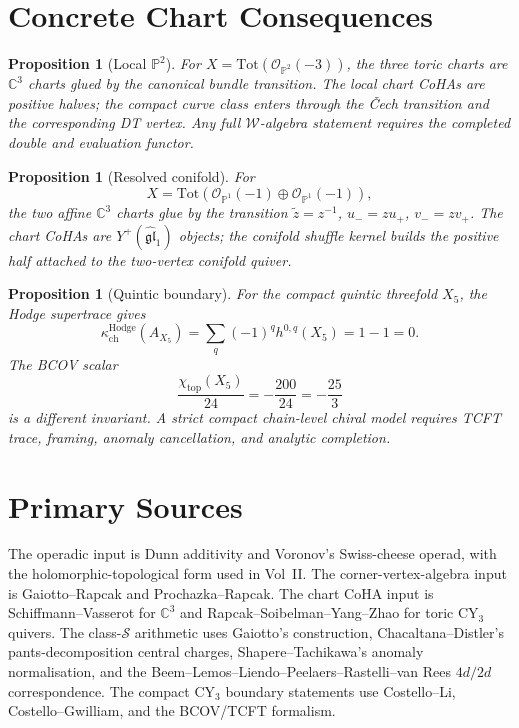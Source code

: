 \documentclass[11pt]{article}
\newtheorem{proposition}[theorem]{Proposition}
\providecommand{\C}{\mathbb{C}}
\providecommand{\bP}{\mathbb{P}}
\providecommand{\cW}{\mathcal{W}}
\providecommand{\cO}{\mathcal{O}}
\providecommand{\kch}{\kappa_{\mathrm{ch}}}
\begin{document}
\section{Concrete Chart Consequences}

\begin{proposition}[Local $\bP^2$]
For $X=\mathrm{Tot}(\cO_{\bP^2}(-3))$, the three toric charts are
$\C^3$ charts glued by the canonical bundle transition. The local chart
CoHAs are positive halves; the compact curve class enters through the
\v{C}ech transition and the corresponding DT vertex. Any full
$\cW$-algebra statement requires the completed double and evaluation
functor.
\end{proposition}

\begin{proposition}[Resolved conifold]
For
\[
  X=\mathrm{Tot}(\cO_{\bP^1}(-1)\oplus\cO_{\bP^1}(-1)),
\]
the two affine $\C^3$ charts glue by the transition
$\tilde z=z^{-1}$, $u_-=zu_+$, $v_-=zv_+$. The chart CoHAs are
$Y^+(\widehat{\mathfrak{gl}}_1)$ objects; the conifold shuffle kernel
builds the positive half attached to the two-vertex conifold quiver.
\end{proposition}

\begin{proposition}[Quintic boundary]
For the compact quintic threefold $X_5$, the Hodge supertrace gives
\[
  \kch^{\mathrm{Hodge}}(A_{X_5})=
  \sum_q(-1)^qh^{0,q}(X_5)=1-1=0.
\]
The BCOV scalar
\[
  \frac{\chi_{\mathrm{top}}(X_5)}{24}=-\frac{200}{24}=-\frac{25}{3}
\]
is a different invariant. A strict compact chain-level chiral model
requires TCFT trace, framing, anomaly cancellation, and analytic
completion.
\end{proposition}

\section{Primary Sources}

The operadic input is Dunn additivity and Voronov's Swiss-cheese
operad, with the holomorphic-topological form used in Vol~II. The
corner-vertex-algebra input is Gaiotto--Rapcak and
Prochazka--Rapcak. The chart CoHA input is Schiffmann--Vasserot for
$\C^3$ and Rapcak--Soibelman--Yang--Zhao for toric CY$_3$ quivers.
The class-$\mathcal S$ arithmetic uses Gaiotto's construction,
Chacaltana--Distler's pants-decomposition central charges,
Shapere--Tachikawa's anomaly normalisation, and the
Beem--Lemos--Liendo--Peelaers--Rastelli--van Rees $4d/2d$
correspondence. The compact CY$_3$ boundary statements use
Costello--Li, Costello--Gwilliam, and the BCOV/TCFT formalism.
\end{document}
